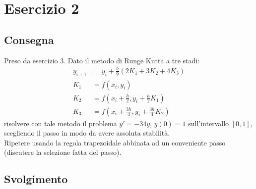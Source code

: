 \documentclass[11pt]{article}
\begin{document}
\section{Esercizio 2}
\subsection{Consegna}
Preso da esercizio 3. Dato il metodo di Runge Kutta a tre stadi:
\begin{align}
	y_{i+1}&=y_i+\frac{h}{9}(2K_1+3K_2+4K_3)\\
	K_1&=f(x_i,y_i)\\
	K_2&=f(x_i+\frac{h}{2} ,y_i+\frac{h}{2}K_1)\\
	K_3&=f(x_i+\frac{3h}{4} ,y_i+\frac{3h}{4}K_2)
\end{align}
risolvere con tale metodo il problema $y'=-34y$,   $y(0)=1$ sull’intervallo $[0, 1]$, scegliendo il passo in modo da avere assoluta stabilità.\\
Ripetere usando la regola trapezoidale abbinata ad un conveniente passo (discutere la selezione fatta del passo).
\subsection{Svolgimento}
\end{document}
